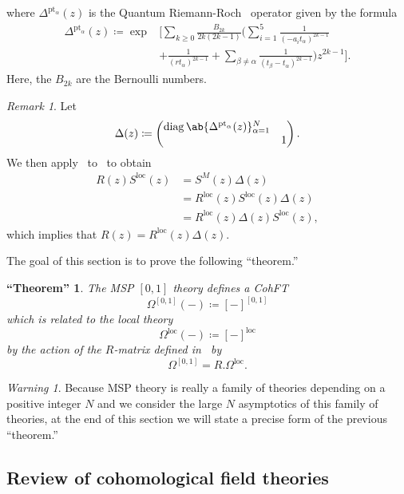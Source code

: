 \documentclass[10pt]{amsart}
\newtheorem{fthm}[thm]{``Theorem''}
\theoremstyle{definition}
\theoremstyle{remark}
\newtheorem{rmk}[thm]{Remark}
\newtheorem{warn}[thm]{Warning}
\theoremstyle{plain}
\theoremstyle{definition}
\theoremstyle{remark}
\newcommand{\mr}[1]{\mathrm{#1}}
\newcommand{\on}[1]{\operatorname{#1}}
\newcommand{\1}{\mathbf{1}}
\newcommand{\2}{\mathbf{2}}
\newcommand{\3}{\mathbf{3}}
\newcommand{\pt}{\mr{pt}}
\newcommand{\loc}{\mr{loc}}
\numberwithin{equation}{section}
\begin{document}
where $\Delta^{\pt_{\alpha}}(z)$ is the Quantum Riemann-Roch~\cite{qrr} operator given by the formula
\begin{align*}
    \Delta^{\pt_{\alpha}}(z) \coloneqq \exp &\Biggl[\sum_{k \geq 0} \frac{B_{2k}}{2k(2k-1)} \Biggl(\sum_{i=1}^5 \frac{1}{(-a_i t_{\alpha})^{2k-1}}  \\
    &+ \frac{1}{(rt_{\alpha})^{2k-1}} + \sum_{\beta \neq \alpha} \frac{1}{(t_{\beta} - t_{\alpha})^{2k-1}}\Biggr) z^{2k-1} \Biggr].
\end{align*}
Here, the $B_{2k}$ are the Bernoulli numbers.

\begin{rmk}
    Let
    \[ \Delta(z) \coloneqq \begin{pmatrix}
    \on{diag}\ab\{ \Delta^{\pt_{\alpha}}(z)\}_{\alpha=1}^N & \\
    & 1
    \end{pmatrix}. \]
    We then apply~ to~ to obtain
    \begin{align*}
    R(z) S^{\loc}(z) &= S^M(z) \Delta(z) \\
        &= R^{\loc}(z) S^{\loc}(z) \Delta(z)  \\
        &= R^{\loc}(z) \Delta(z) S^{\loc}(z),
    \end{align*}
    which implies that $R(z) = R^{\loc}(z) \Delta(z)$.
\end{rmk}

The goal of this section is to prove the following ``theorem.''
\begin{fthm}\label{fthm:cohft}
    The MSP $[0,1]$ theory defines a CohFT 
    \[\Omega^{[0,1]}(-) \coloneqq [-]^{[0,1]} \] which is related to the local theory
    \[ \Omega^{\loc}(-) \coloneqq [-]^{\loc} \]
    by the action of the $R$-matrix defined in~ by
    \[ \Omega^{[0,1]} = R.\Omega^{\loc}. \]
\end{fthm}

\begin{warn}
    Because MSP theory is really a family of theories depending on a positive integer $N$ and we consider the large $N$ asymptotics of this family of theories, at the end of this section we will state a precise form of the previous ``theorem.''
\end{warn}


\subsection{Review of cohomological field theories}%
\label{sub:Review of cohomological field theories}
\end{document}
